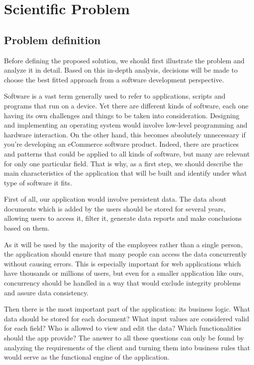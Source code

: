 \chapter{Scientific Problem}
\label{section:scientificProblem}



\section{Problem definition}
\label{section:problemDefinition}

Before defining the proposed solution, we should first illustrate the problem and analyze it in detail. Based on this in-depth analysis, decisions will be made to choose the best fitted approach from a software development perspective.

Software is a vast term generally used to refer to applications, scripts and programs that run on a device. Yet there are different kinds of software, each one having its own challenges and things to be taken into consideration. Designing and implementing an operating system would involve low-level programming and hardware interaction. On the other hand, this becomes absolutely unnecessary if you're developing an eCommerce software product. Indeed, there are practices and patterns that could be applied to all kinds of software, but many are relevant for only one particular field. That is why, as a first step, we should describe the main characteristics of the application that will be built and identify under what type of software it fits.

First of all, our application would involve persistent data. The data about documents which is added by the users should be stored for several years, allowing users to access it, filter it, generate data reports and make conclusions based on them.

As it will be used by the majority of the employees rather than a single person, the application should ensure that many people can access the data concurrently without causing errors. This is especially important for web applications which have thousands or millions of users, but even for a smaller application like ours, concurrency should be handled in a way that would exclude integrity problems and assure data consistency.

Then there is the most important part of the application: its business logic. What data should be stored for each document? What input values are considered valid for each field? Who is allowed to view and edit the data? Which functionalities should the app provide? The answer to all these questions can only be found by analyzing the requirements of the client and turning them into business rules that would serve as the functional engine of the application.

